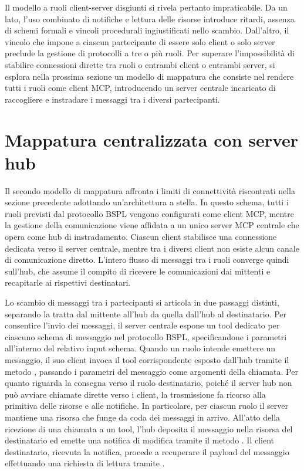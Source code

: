 Il modello a ruoli client-server disgiunti si rivela pertanto impraticabile. Da un lato, l'uso combinato di notifiche e lettura delle risorse introduce ritardi, assenza di schemi formali e vincoli procedurali ingiustificati nello scambio. Dall'altro, il vincolo che impone a ciascun partecipante di essere solo client o solo server preclude la gestione di protocolli a tre o più ruoli. Per superare l'impossibilità di stabilire connessioni dirette tra ruoli o entrambi client o entrambi server, si esplora nella prossima sezione un modello di mappatura che consiste nel rendere tutti i ruoli come client MCP, introducendo un server centrale incaricato di raccogliere e instradare i messaggi tra i diversi partecipanti.

\section{Mappatura centralizzata con server hub}\label{mappatura-hub}

Il secondo modello di mappatura affronta i limiti di connettività riscontrati nella sezione precedente adottando un'architettura a stella. In questo schema, tutti i ruoli previsti dal protocollo BSPL vengono configurati come client MCP, mentre la gestione della comunicazione viene affidata a un unico server MCP centrale che opera come hub di instradamento. Ciascun client stabilisce una connessione dedicata verso il server centrale, mentre tra i diversi client non esiste alcun canale di comunicazione diretto. L'intero flusso di messaggi tra i ruoli converge quindi sull'hub, che assume il compito di ricevere le comunicazioni dai mittenti e recapitarle ai rispettivi destinatari.

Lo scambio di messaggi tra i partecipanti si articola in due passaggi distinti, separando la tratta dal mittente all'hub da quella dall'hub al destinatario. Per consentire l'invio dei messaggi, il server centrale espone un tool dedicato per ciascuno schema di messaggio nel protocollo BSPL, specificandone i parametri all'interno del relativo input schema.
Quando un ruolo intende emettere un messaggio, il suo client invoca il tool corrispondente esposto dall'hub tramite il metodo , passando i parametri del messaggio come argomenti della chiamata. Per quanto riguarda la consegna verso il ruolo destinatario, poiché il server hub non può avviare chiamate dirette verso i client, la trasmissione fa ricorso alla primitiva delle risorse e alle notifiche. In particolare, per ciascun ruolo il server mantiene una risorsa che funge da coda dei messaggi in arrivo. All'atto della ricezione di una chiamata a un tool, l'hub deposita il messaggio nella risorsa del destinatario ed emette una notifica di modifica tramite il metodo . Il client destinatario, ricevuta la notifica, procede a recuperare il payload del messaggio effettuando una richiesta di lettura tramite .

